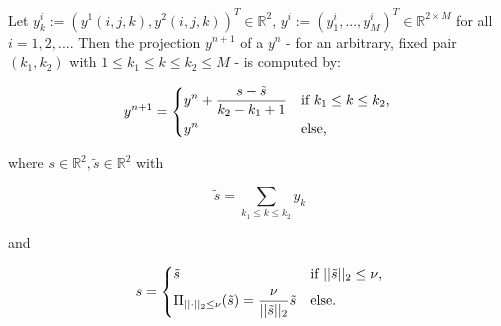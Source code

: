                     \begin{algorithm}\label{alg:softshrinkage}
                        Let $y^{i}_{k} := (y^{1}(i, j, k), y^{2}(i, j, k))^{T} \in \mathbb{R}^{2}$, $y^{i} := (y^{i}_{1}, ..., y^{i}_{M})^{T} \in \mathbb{R}^{2 \times M}$ for all $i = 1, 2, ...$. Then the projection $y^{n+1}$ of a $y^{n}$ - for an arbitrary, fixed pair $(k_{1}, k_{2})$ with $1 \le k_{1} \le k \le k_{2} \le M$ - is computed by:

                            \[
                                y^{n+1} =
                                    \begin{dcases*}
                                        y^{n} + \frac{s - \tilde{s}}{k_{2} - k_{1} + 1} & \textnormal{if $k_{1} \le k \le k_{2}$}, \\
                                        y^{n} & \textnormal{else},
                                    \end{dcases*}
                            \]

                        where $s \in \mathbb{R}^{2}, \tilde{s} \in \mathbb{R}^{2}$ with

                            $$\tilde{s} = \sum_{k_{1} \le k \le k_{2}} y_{k}$$

                        and

                            \[
                                s =
                                    \begin{dcases*}
                                        \tilde{s} & \textnormal{if $||\tilde{s}||_{2} \le \nu$},\\
                                        \Pi_{||\cdot||_{2} \le \nu}(\tilde{s}) = \frac{\nu}{||\tilde{s}||_{2}} \tilde{s} & \textnormal{else}.
                                    \end{dcases*}
                            \]


\end{algorithm}
